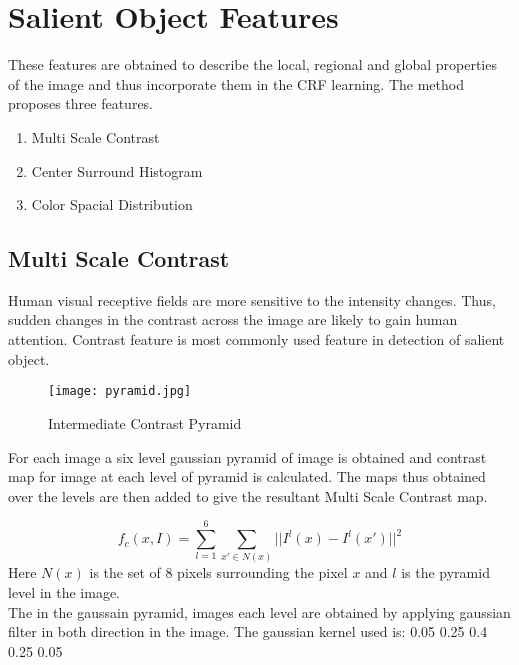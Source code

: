 \documentclass[11pt]{report}
\begin{document}
\section*{Salient Object Features}
These features are obtained to describe the local, regional and global properties of the image and thus incorporate them in the CRF learning. The method \cite{mainpaper} proposes three features.
\begin{enumerate}
\item Multi Scale Contrast 
\item Center Surround Histogram
\item Color Spacial Distribution
\end{enumerate}

\subsection*{Multi Scale Contrast}
Human visual receptive fields are more sensitive to the intensity changes. Thus, sudden changes in the contrast across the image are likely to gain human attention.  Contrast feature is most commonly used feature in detection of salient object.

\begin{figure}[h!]
\center \texttt{[image: pyramid.jpg]}
\caption{Intermediate Contrast Pyramid}
\end{figure} 
For each image a six level gaussian pyramid of image is obtained and contrast map for image at each level of pyramid is calculated. The maps thus obtained over the levels are then added to give the resultant Multi Scale Contrast map.

\begin{equation}
f_c(x,I) = \sum_{l=1}^{6}\sum_{x' \in N(x)} ||I^l(x) - I^l(x')|| ^2
\end{equation}
Here $N(x)$ is the set of 8 pixels surrounding the pixel $x$ and $l$ is the pyramid level in the image.\\
The in the gaussain pyramid, images each level are obtained by applying gaussian filter in both direction in the image. The gaussian kernel used is: 0.05 0.25 0.4 0.25 0.05 \\

\end{document}
